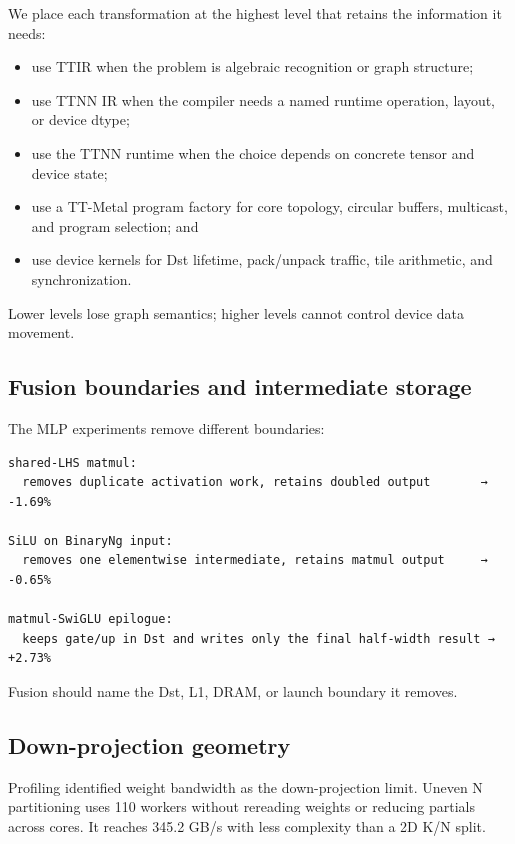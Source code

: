 \documentclass[
  10pt,
  american,
  10pt,
  letterpaper]{article}
\providecommand{\tightlist}{%
  \setlength{\itemsep}{0pt}\setlength{\parskip}{0pt}}
\begin{document}
We place each transformation at the highest level that retains the
information it needs:

\begin{itemize}
\tightlist
\item
  use TTIR when the problem is algebraic recognition or graph structure;
\item
  use TTNN IR when the compiler needs a named runtime operation, layout,
  or device dtype;
\item
  use the TTNN runtime when the choice depends on concrete tensor and
  device state;
\item
  use a TT-Metal program factory for core topology, circular buffers,
  multicast, and program selection; and
\item
  use device kernels for Dst lifetime, pack/unpack traffic, tile
  arithmetic, and synchronization.
\end{itemize}

Lower levels lose graph semantics; higher levels cannot control device
data movement.

\hypertarget{fusion-boundaries-and-intermediate-storage}{%
\subsection{Fusion boundaries and intermediate
storage}\label{fusion-boundaries-and-intermediate-storage}}

The MLP experiments remove different boundaries:

\begin{verbatim}
shared-LHS matmul:
  removes duplicate activation work, retains doubled output       → -1.69%

SiLU on BinaryNg input:
  removes one elementwise intermediate, retains matmul output     → -0.65%

matmul-SwiGLU epilogue:
  keeps gate/up in Dst and writes only the final half-width result → +2.73%
\end{verbatim}

Fusion should name the Dst, L1, DRAM, or launch boundary it removes.

\hypertarget{down-projection-geometry}{%
\subsection{Down-projection geometry}\label{down-projection-geometry}}

Profiling identified weight bandwidth as the down-projection limit.
Uneven N partitioning uses 110 workers without rereading weights or
reducing partials across cores. It reaches 345.2 GB/s with less
complexity than a 2D K/N split.
\end{document}
